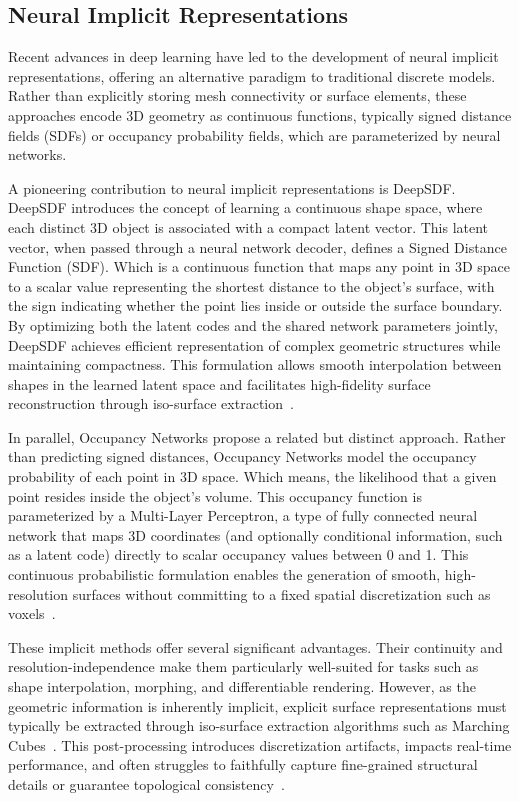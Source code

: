 \subsection{Neural Implicit Representations}

Recent advances in deep learning have led to the development of neural implicit representations, offering an alternative paradigm to traditional discrete models.  
Rather than explicitly storing mesh connectivity or surface elements, these approaches encode 3D geometry as continuous functions, typically signed distance fields (SDFs) or occupancy probability fields, which are parameterized by neural networks.  

A pioneering contribution to neural implicit representations is DeepSDF.  
DeepSDF introduces the concept of learning a continuous shape space, where each distinct 3D object is associated with a compact latent vector.  
This latent vector, when passed through a neural network decoder, defines a Signed Distance Function (SDF).  
Which is a continuous function that maps any point in 3D space to a scalar value representing the shortest distance to the object's surface, with the sign indicating whether the point lies inside or outside the surface boundary.  
By optimizing both the latent codes and the shared network parameters jointly, DeepSDF achieves efficient representation of complex geometric structures while maintaining compactness.  
This formulation allows smooth interpolation between shapes in the learned latent space and facilitates high-fidelity surface reconstruction through iso-surface extraction~\cite{park2019}.  

In parallel, Occupancy Networks propose a related but distinct approach.  
Rather than predicting signed distances, Occupancy Networks model the occupancy probability of each point in 3D space.  
Which means, the likelihood that a given point resides inside the object's volume.  
This occupancy function is parameterized by a Multi-Layer Perceptron, a type of fully connected neural network that maps 3D coordinates (and optionally conditional information, such as a latent code) directly to scalar occupancy values between 0 and 1.  
This continuous probabilistic formulation enables the generation of smooth, high-resolution surfaces without committing to a fixed spatial discretization such as voxels~\cite{mescheder2019}.  

These implicit methods offer several significant advantages.  
Their continuity and resolution-independence make them particularly well-suited for tasks such as shape interpolation, morphing, and differentiable rendering.  
However, as the geometric information is inherently implicit, explicit surface representations must typically be extracted through iso-surface extraction algorithms such as Marching Cubes~\cite{lorensen1987}.  
This post-processing introduces discretization artifacts, impacts real-time performance, and often struggles to faithfully capture fine-grained structural details or guarantee topological consistency~\cite{sitzmann2020}.  

